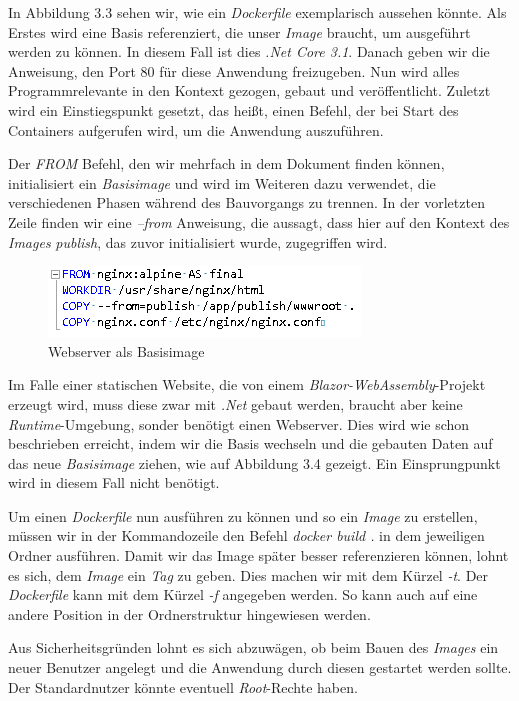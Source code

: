 \documentclass[12pt,a4paper]{scrartcl}
\begin{document}
In Abbildung 3.3 sehen wir, wie ein \emph{Dockerfile} exemplarisch aussehen könnte. Als Erstes wird eine Basis referenziert, die unser \emph{Image} braucht, um ausgeführt werden zu können. In diesem Fall ist dies \emph{.Net Core 3.1}. Danach geben wir die Anweisung, den Port 80 für diese Anwendung freizugeben. Nun wird alles Programmrelevante in den Kontext gezogen, gebaut und veröffentlicht. Zuletzt wird ein Einstiegspunkt gesetzt, das heißt, einen Befehl, der bei Start des Containers aufgerufen wird, um die Anwendung auszuführen. 

Der \emph{FROM} Befehl, den wir mehrfach in dem Dokument finden können, initialisiert ein \emph{Basisimage} und wird im Weiteren dazu verwendet, die verschiedenen Phasen während des Bauvorgangs zu trennen. In der vorletzten Zeile finden wir eine \emph{--from} Anweisung, die aussagt, dass hier auf den Kontext des \emph{Images} \emph{publish}, das zuvor initialisiert wurde, zugegriffen wird.

\begin{figure}[h!]
	\centering
	\includegraphics[scale=1]{DockerfileBlazor.png}
	\caption[Screenshot]{Webserver als Basisimage}
\end{figure}

Im Falle einer statischen Website, die von einem \emph{Blazor-WebAssembly}-Projekt erzeugt wird, muss diese zwar mit \emph{.Net} gebaut werden, braucht aber keine \emph{Runtime}-Umgebung, sonder benötigt einen Webserver.
Dies wird wie schon beschrieben erreicht, indem wir die Basis wechseln und die gebauten Daten auf das neue \emph{Basisimage} ziehen, wie auf Abbildung 3.4 gezeigt. Ein Einsprungpunkt wird in diesem Fall nicht benötigt.

Um einen \emph{Dockerfile} nun ausführen zu können und so ein \emph{Image} zu erstellen, müssen wir in der Kommandozeile den Befehl \emph{docker build .} in dem jeweiligen Ordner ausführen. Damit wir das Image später besser referenzieren können, lohnt es sich, dem \emph{Image} ein \emph{Tag} zu geben. Dies machen wir mit dem Kürzel \emph{-t}. Der \emph{Dockerfile} kann mit dem Kürzel \emph{-f} angegeben werden. So kann auch auf eine andere Position in der Ordnerstruktur hingewiesen werden.

Aus Sicherheitsgründen lohnt es sich abzuwägen, ob beim Bauen des \emph{Images} ein neuer Benutzer angelegt und die Anwendung durch diesen gestartet werden sollte. Der Standardnutzer könnte eventuell \emph{Root}-Rechte haben.
\end{document}
